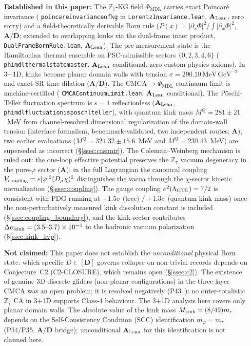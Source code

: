 \documentclass[11pt]{article}
\theoremstyle{remark}
\newcommand{\PHIMDL}{\Phi_{\mathrm{MDL}}}
\newcommand{\ZS}{\mathbb{Z}_7}
\newcommand{\lean}[1]{%
  \penalty-100
  \begingroup\def\_{\textunderscore\allowbreak}\texttt{#1}\endgroup}
\newcommand{\Mkink}{M_{\rm kink}}
\newcommand{\mtau}{m_\tau}
\newcommand{\CatA}{\textbf{A}}
\newcommand{\CatAL}{\ensuremath{\textbf{A}_{\rm Lean}}}
\newcommand{\CatAD}{\textbf{A/D}}
\begin{document}
\medskip

\begin{tcolorbox}[colback=orange!4,colframe=orange!55!black,
  title={\textbf{What this paper does and does not claim}},
  fonttitle=\bfseries,left=6pt,right=6pt,top=5pt,bottom=5pt]
\small
\textbf{Established in this paper:}
The $\ZS$-KG field $\PHIMDL$ carries exact Poincar\'e invariance
(\lean{poincare\_invariance\_of\_kg} in \lean{LorentzInvariance.lean},
$\CatAL$, zero sorry) and a field-theoretically derivable Born rule
($P(x)=|\partial_x\Phi|^2/\int|\partial_x\Phi|^2$, $\CatAD$; extended
to overlapping kinks via the dual-frame inner product,
\lean{DualFrameBornRule.lean}, $\CatAL$).
The pre-measurement state is the Hamiltonian thermal ensemble on
PSC-admissible sectors $\{0,2,3,4,6\}$
(\lean{phimdl\_thermal\_state\_master}, $\CatAL$ conditional, zero custom
physics axioms).
In 3+1D, kinks become planar domain walls with tension
$\sigma=290.10\,\mathrm{MeV\,GeV}^{-2}$ and exact SR time dilation ($\CatAD$).
The CMCA$\to\PHIMDL$ continuum limit is machine-certified
(\lean{CMCAContinuumLimit.lean}, $\CatAL$ conditional).
The Pöschl-Teller fluctuation spectrum is $s=1$ reflectionless ($\CatAL$,
\lean{phimdl\_fluctuation\_is\_poschl\_teller}), with quantum kink mass
$M^Q = 281 \pm 21$~MeV from channel-resolved dimensional regularization of the
domain-wall tension (interface formalism, benchmark-validated, two independent
routes; $\CatA$); two earlier evaluations ($M^Q = 321.32 \pm 15.6$~MeV and
$M^Q = 230.43$~MeV) are superseded as incorrect (\S\ref{ssec:casimir}).
The Coleman--Weinberg mechanism is ruled out: the one-loop effective potential
preserves the $\mathbb{Z}_7$ vacuum degeneracy in the pure-$\varphi$ sector
($\CatA$); in the full Lagrangian the canonical coupling
$V_{\rm coupling}=\varepsilon|\varphi|^2(D_\mu\chi)^2$ distinguishes the vacua
through the $\chi$-sector kinetic normalization (\S\ref{ssec:coupling}).
The gauge coupling $e^2(\Lambda_{\rm GTE})=7/2$ is consistent with PDG running
at $+1.5\sigma$ (tree) / $+1.3\sigma$ (quantum kink mass) once the
non-perturbatively measured kink dissolution constant is included
(\S\ref{ssec:coupling_boundary}), and the kink sector contributes
$\Delta\alpha_{\rm kink} = (3.5\text{--}3.7)\times10^{-4}$ to the hadronic
vacuum polarization (\S\ref{ssec:kink_hvp}).

\textbf{Not claimed:}
This paper does not establish the \emph{unconditional} physical Born state:
which specific $D\in[\mathbf{D}]$ governs collapse on non-trivial records
depends on Conjecture~C2 (C2-CLOSURE), which remains open (\S\ref{ssec:c2}).
The existence of genuine 3D discrete gliders (non-planar configurations)
in the three-layer CMCA was an open problem; it is resolved negatively
(P43~\cite{SpivackCompleteness}): no outer-totalistic $\ZS$ CA in 3+1D
supports Class-4 behaviour.  The 3+1D analysis here covers only planar domain walls.
The absolute value of the kink mass $\Mkink=(8/49)\mtau$ depends on the
Self-Consistency Condition (SCC) identification $m_\varphi=\mtau$ (P34/P35, $\CatAD$
bridge); unconditional $\CatAL$ for this identification is not claimed here.
\end{tcolorbox}
\end{document}

